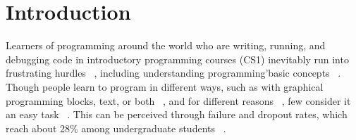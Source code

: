 \documentclass[sigconf]{acmart}
\begin{document}



%

%

%
\maketitle

\section{Introduction}

Learners of programming around the world who are writing, running, and debugging code in introductory programming courses (CS1) inevitably run into frustrating hurdles ~\cite{Drosos17}, including understanding programming\textquoteright \space basic concepts ~\cite{Mutka04,Garner05,Gomes15,Hristova03,Jenkins02,Milne02,Weintrop15}. Though people learn to program in different ways, such as with graphical programming blocks, text, or both  ~\cite{Weintrop15,Lee14,Ichinco17}, and for different reasons ~\cite{Bergstrom16}, few consider it an easy task ~\cite{Gomes15,Jenkins02, Lahtinen05}. This can be perceived through failure and dropout rates, which reach about 28\% among undergraduate students  ~\cite{Bennedsen07,Bosse16}.
\end{document}
